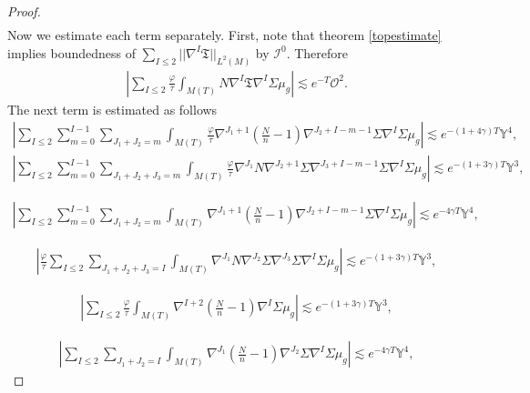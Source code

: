 \documentclass{amsart}
\begin{document}
\begin{proof}
\begin{align}
\end{align}
Now we estimate each term separately. First, note that theorem \ref{topestimate} implies boundedness of $\sum_{I\leq 2}||\nabla^{I}\mathfrak{T}||_{L^{2}(M)}$ by $\mathcal{I}^{0}$. Therefore   
\begin{align}
 |\sum_{I\leq 2}\frac{\varphi}{\tau}\int_{M(T)}N \nabla^{I}\mathfrak{T}\nabla^{I}\Sigma\mu_{g}|\lesssim e^{-T}\mathcal{O}^{2}.   
\end{align}
The next term is estimated as follows 
\begin{align}
|\sum_{I\leq 2} \sum_{m=0}^{I-1}\sum_{J_{1}+J_{2}=m}\int_{M(T)}\frac{\varphi}{\tau}\nabla^{J_{1}+1}(\frac{N}{n}-1)\nabla^{J_{2}+I-m-1}\Sigma\nabla^{I}\Sigma\mu_{g}|   \lesssim e^{-(1+4\gamma)T}\mathds{Y}^{4}, 
\end{align}
\begin{align}
 |\sum_{I\leq 2}\sum_{m=0}^{I-1}\sum_{J_{1}+J_{2}+J_{3}=m}\int_{M(T)}\frac{\varphi}{\tau}\nabla^{J_{1}}N\nabla^{J_{2}+1}\Sigma\nabla^{J_{3}+I-m-1}\Sigma\nabla^{I}\Sigma\mu_{g}|\lesssim e^{-(1+3\gamma)T}\mathds{Y}^{3},   
\end{align}


\begin{align}
|\sum_{I\leq 2}\sum_{m=0}^{I-1}\sum_{J_{1}+J_{2}=m}\int_{M(T)}\nabla^{J_{1}+1}(\frac{N}{n}-1)\nabla^{J_{2}+I-m-1}\Sigma\nabla^{I}\Sigma\mu_{g}|\lesssim e^{-4\gamma T}\mathds{Y}^{4},    
\end{align}

\begin{align}
|\frac{\varphi}{\tau}\sum_{I\leq 2}\sum_{J_{1}+J_{2}+J_{3}=I}\int_{M(T)}\nabla^{J_{1}}N\nabla^{J_{2}}\Sigma\nabla^{J_{3}}\Sigma\nabla^{I}\Sigma\mu_{g}|\lesssim e^{-(1+3\gamma)T}\mathds{Y}^{3},
\end{align}

\begin{align}
|\sum_{I\leq 2}\frac{\varphi}{\tau}\int_{M(T)}\nabla^{I+2}(\frac{N}{n}-1)\nabla^{I}\Sigma\mu_{g}|\lesssim e^{-(1+3\gamma)T}\mathds{Y}^{3},
\end{align}

\begin{align}
 |\sum_{I\leq 2}\sum_{J_{1}+J_{2}=I}\int_{M(T)}\nabla^{J_{1}}(\frac{N}{n}-1)\nabla^{J_{2}}\Sigma\nabla^{I}\Sigma\mu_{g}| \lesssim e^{-4\gamma T} \mathds{Y}^{4}, 
\end{align}


\end{proof}
\end{document}
